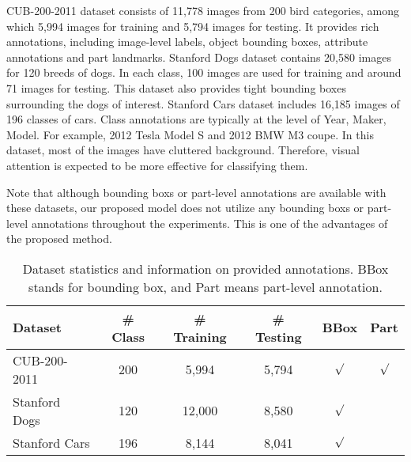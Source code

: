 \documentclass[journal]{IEEEtran}
\begin{document}
CUB-200-2011 dataset consists of 11,778 images from 200 bird categories, among which 5,994 images for training and 5,794 images for testing. It provides rich annotations, including image-level labels, object bounding boxes, attribute annotations and part landmarks.
Stanford Dogs dataset contains 20,580 images for 120 breeds of dogs. In each class, 100 images are used for training and around 71 images for testing. This dataset also provides tight bounding boxes surrounding the dogs of interest.
Stanford Cars dataset includes 16,185 images of 196 classes of cars. Class annotations are typically at the level of Year, Maker, Model. For example, 2012 Tesla Model S and 2012 BMW M3 coupe. In this dataset, most of the images have cluttered background. Therefore, visual attention is expected to be more effective for classifying them.

Note that although  bounding boxs or part-level annotations are available with these datasets,  our proposed model does not utilize any bounding boxs or part-level annotations throughout the experiments. This is one of the advantages of the proposed method.

\begin{table}[tp]
  \centering
  \caption{Dataset statistics and information on provided annotations. BBox stands for  bounding box, and Part  means  part-level annotation.}
  \vspace{-0.1in}  
  \label{tab:datasets}
  \begin{tabular}{l c c c c c}
    \hline\hline
    Dataset & \# Class & \# Training & \# Testing & BBox & Part \\
    \hline
    CUB-200-2011 \cite{CUB_200_2011}& 200 & 5,994 & 5,794 & $\surd$ & $\surd$\\
    Stanford Dogs \cite{standford_dogs}& 120 & 12,000 & 8,580 & $\surd$ & \\
    Stanford Cars \cite{standford_cars}& 196 & 8,144 & 8,041 & $\surd$ & \\
   \hline\hline
  \end{tabular}
\vspace{-0.2in}
\end{table}
\end{document}
